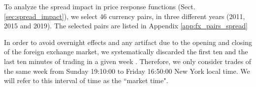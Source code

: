 To analyze the spread impact in price response functions (Sect.
\ref{sec:spread_impact}), we select 46 currency pairs, in three different years
(2011, 2015 and 2019). The selected pairs are listed in Appendix
\ref{app:fx_pairs_spread}

In order to avoid overnight effects and any artifact due to the opening and
closing of the foreign exchange market, we systematically discarded the first
ten and the last ten minutes of trading in a given week
\cite{Bouchaud_2004,large_prices_changes,spread_changes_affect,my_paper_response_financial,Wang_2016_cross}.
Therefore, we only consider trades of the same week from Sunday 19:10:00 to
Friday 16:50:00 New York local time. We will refer to this interval of time as
the ``market time".
